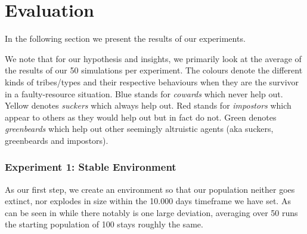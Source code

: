 \documentclass[sigconf]{acmart}
\newcommand{\VNumSimulations}{50\xspace}
\newcommand{\VNumDays}{10.000\xspace}
\newcommand{\cowards}{\textit{cowards}\xspace}
\newcommand{\suckers}{\textit{suckers}\xspace}
\newcommand{\impostors}{\textit{impostors}\xspace}
\newcommand{\greenbeards}{\textit{greenbeards}\xspace}
\begin{document}
    \section{Evaluation}\label{sec:evaluation}

    In the following section we present the results of our experiments.

    We note that for our hypothesis and insights, we primarily look at the average of the results of our \VNumSimulations simulations per experiment.
    The colours denote the different kinds of tribes/types and their respective behaviours when they are the survivor in a faulty-resource situation.
    Blue stands for \cowards which never help out.
    Yellow denotes \suckers which always help out.
    Red stands for \impostors which appear to others as they would help out but in fact do not.
    Green denotes \greenbeards which help out other seemingly altruistic agents (aka suckers, greenbeards and impostors).


    \subsubsection*{Experiment 1: Stable Environment}
    As our first step, we create an environment so that our population neither goes extinct, nor explodes in size within the \VNumDays days timeframe we have set.
    As can be seen in  while there notably is one large deviation, averaging over \VNumSimulations runs the starting population of 100 stays roughly the same.
\end{document}

